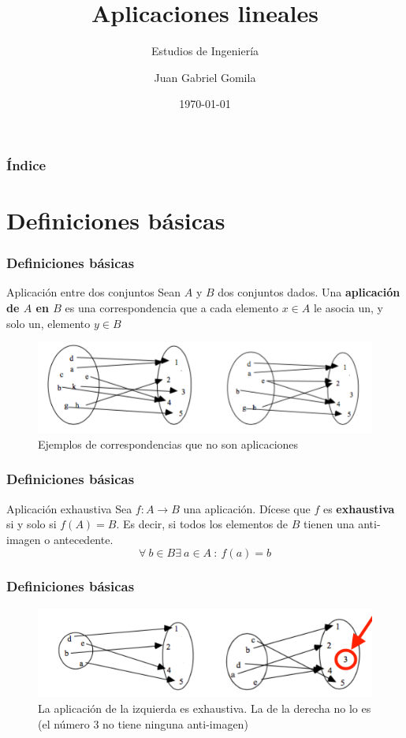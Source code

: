 \documentclass{beamer}
\title[Tema 4 - Aplicaciones lineales]{Aplicaciones lineales}
\subtitle{Estudios de Ingenier\'ia}
\author[https://frogames.es]{
Juan Gabriel Gomila%
}
\institute[Frogames]{
 Frogames
   \and
  \texttt{https://frogames.es}
}
\date{\today}
\begin{document}
 

\frame{\titlepage}

\begin{frame}
  \frametitle{\'Indice}
  \tableofcontents
\end{frame}

\section{Definiciones b\'asicas}

\begin{frame}
  \frametitle{Definiciones b\'asicas}
  \begin{block}{Aplicaci\'on entre dos conjuntos}
Sean $A$ y $B$ dos conjuntos dados. Una \textbf{aplicaci\'on de $A$ en $B$} es una correspondencia que a cada elemento $x\in A$ le asocia un, y solo un, elemento $y\in B$ 
\end{block}

\begin{figure}[h]
  \label{fig:esquema}
  \caption{Ejemplos de correspondencias que no son aplicaciones}
\centering
\includegraphics[width=\textwidth]{no_aplicacio}
\end{figure}
\end{frame}




\begin{frame}
  \frametitle{Definiciones b\'asicas}
  \begin{block}{Aplicaci\'on exhaustiva}
Sea $f:A\longrightarrow B$ una aplicaci\'on. D\'icese que $f$ es \textbf{exhaustiva} si y solo si $f(A) = B$. Es decir, si todos los elementos de $B$ tienen una anti-imagen o antecedente.
\[\forall\ b\in B \exists \ a\in A\ : \ f(a) = b\]
\end{block}
\end{frame}

\begin{frame}
  \frametitle{Definiciones b\'asicas}
\begin{figure}[h]
  \label{fig:esquema}
  \caption{La aplicaci\'on de la izquierda es exhaustiva. La de la derecha no lo es (el n\'umero 3 no tiene ninguna anti-imagen)}
\centering
\includegraphics[width=\textwidth]{exhaustiva}
\end{figure}
\end{frame}
\end{document}
